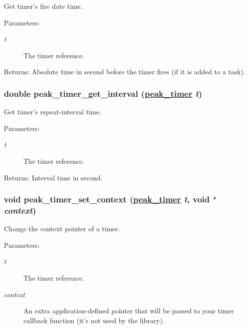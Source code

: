 Get timer's fire date time. 

\begin{Desc}
\item[Parameters:]
\begin{description}
\item[{\em t}]The timer reference.\end{description}
\end{Desc}
\begin{Desc}
\item[Returns:]Absolute time in second before the timer fires (if it is added to a task). \end{Desc}
\hypertarget{group__timer_ga5}{
\subsubsection[peak\_\-timer\_\-get\_\-interval]{\setlength{\rightskip}{0pt plus 5cm}double peak\_\-timer\_\-get\_\-interval (\hyperlink{group__timer_ga0}{peak\_\-timer} {\em t})}}
\label{group__timer_ga5}


Get timer's repeat-interval time. 

\begin{Desc}
\item[Parameters:]
\begin{description}
\item[{\em t}]The timer reference.\end{description}
\end{Desc}
\begin{Desc}
\item[Returns:]Interval time in second. \end{Desc}
\hypertarget{group__timer_ga7}{
\subsubsection[peak\_\-timer\_\-set\_\-context]{\setlength{\rightskip}{0pt plus 5cm}void peak\_\-timer\_\-set\_\-context (\hyperlink{group__timer_ga0}{peak\_\-timer} {\em t}, void $\ast$ {\em context})}}
\label{group__timer_ga7}


Change the context pointer of a timer. 

\begin{Desc}
\item[Parameters:]
\begin{description}
\item[{\em t}]The timer reference. \item[{\em context}]An extra application-defined pointer that will be passed to your timer callback function (it's not used by the library). \end{description}
\end{Desc}
